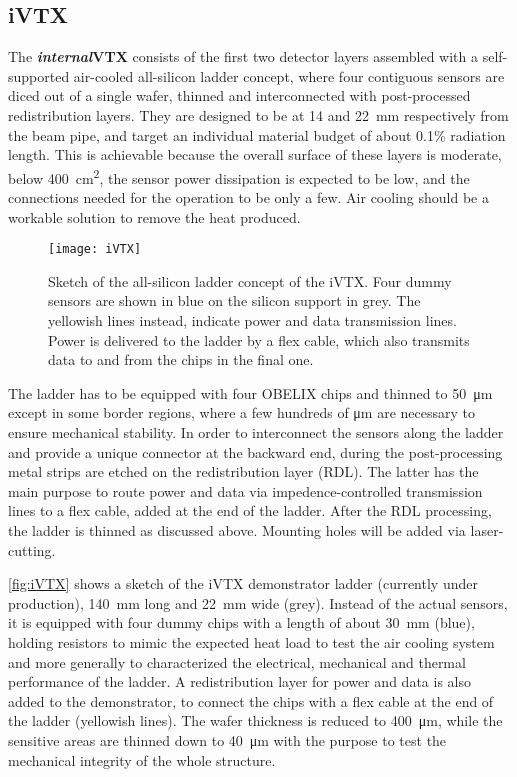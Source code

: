 \subsection{iVTX}

The \textbf{\textit{internal}VTX} consists of the first two detector layers assembled with a self-supported air-cooled all-silicon ladder concept, where four contiguous sensors are diced out of a single wafer, thinned and interconnected with post-processed redistribution layers. They are designed to be at 14 and \SI{22}{mm} respectively from the beam pipe, and target an individual material budget of about 0.1\% radiation length. 
This is achievable because the overall surface of these layers is moderate, below \SI{400}{cm^{2}}, the sensor power dissipation is expected to be low, and the connections needed for the operation to be only a few. Air cooling should be a workable solution to remove the heat produced.


\begin{figure}[h!]
\centering
\texttt{[image: iVTX]}
\caption{Sketch of the all-silicon ladder concept of the iVTX. Four dummy sensors are shown in blue on the silicon support in grey. The yellowish lines instead, indicate power and data transmission lines. Power is delivered to the ladder by a flex cable, which also transmits data to and from the chips in the final one.}
\label{fig:iVTX}
\end{figure}

The ladder has to be equipped with four OBELIX chips and thinned to \SI{50}{\micro m} except in some border regions, where a few hundreds of \unit{\micro m} are necessary to ensure mechanical stability. 
In order to interconnect the sensors along the ladder and provide a unique connector at the backward end, during the post-processing metal strips are etched on the redistribution layer (RDL). The latter has the main purpose to route power and data via impedence-controlled transmission lines to a flex cable, added at the end of the ladder.
After the RDL processing, the ladder is thinned as discussed above. Mounting holes will be added via laser-cutting.


\autoref{fig:iVTX} shows a sketch of the iVTX demonstrator ladder (currently under production), \SI{140}{mm} long and \SI{22}{mm} wide (grey). Instead of the actual sensors, it is equipped with four dummy chips with a length of about \SI{30}{mm} (blue), holding resistors to mimic the expected heat load to test the air cooling system and more generally to characterized the electrical, mechanical and thermal performance of the ladder.
A redistribution layer for power and data is also added to the demonstrator, to connect the chips with a flex cable at the end of the ladder (yellowish lines). The wafer thickness is reduced to \SI{400}{\micro m}, while the sensitive areas are thinned down to \SI{40}{\micro m} with the purpose to test the mechanical integrity of the whole structure.

